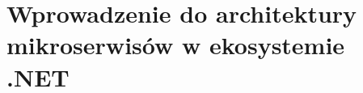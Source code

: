 \cleardoublepage

\chapter{Wprowadzenie do architektury mikroserwisów w ekosystemie .NET}
\label{cha:WprowadzenieDoMikroserwisow}











